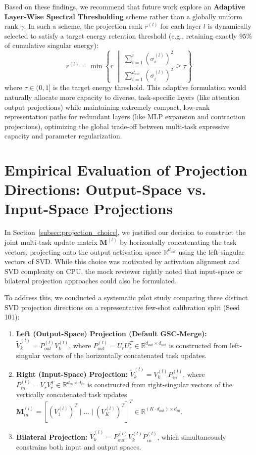 \documentclass{article}
\theoremstyle{plain}
\theoremstyle{definition}
\theoremstyle{remark}
\begin{document}
Based on these findings, we recommend that future work explore an \textbf{Adaptive Layer-Wise Spectral Thresholding} scheme rather than a globally uniform rank $\gamma$. In such a scheme, the projection rank $r^{(l)}$ for each layer $l$ is dynamically selected to satisfy a target energy retention threshold (e.g., retaining exactly $95\%$ of cumulative singular energy):
\begin{equation}
    r^{(l)} = \min \left\{ r \;\middle|\; \frac{\sum_{i=1}^r (\sigma_i^{(l)})^2}{\sum_{i=1}^{d_{out}} (\sigma_i^{(l)})^2} \ge \tau \right\}
\end{equation}
where $\tau \in (0, 1]$ is the target energy threshold. This adaptive formulation would naturally allocate more capacity to diverse, task-specific layers (like attention output projections) while maintaining extremely compact, low-rank representation paths for redundant layers (like MLP expansion and contraction projections), optimizing the global trade-off between multi-task expressive capacity and parameter regularization.

\section{Empirical Evaluation of Projection Directions: Output-Space vs. Input-Space Projections}
\label{appendix:projection_direction_study}

In Section~\ref{subsec:projection_choice}, we justified our decision to construct the joint multi-task update matrix $\mathbf{M}^{(l)}$ by horizontally concatenating the task vectors, projecting onto the output activation space $\mathbb{R}^{d_{out}}$ using the left-singular vectors of SVD. While this choice was motivated by activation alignment and SVD complexity on CPU, the mock reviewer rightly noted that input-space or bilateral projection approaches could also be formulated.

To address this, we conducted a systematic pilot study comparing three distinct SVD projection directions on a representative few-shot calibration split (Seed 101):
\begin{enumerate}
    \item \textbf{Left (Output-Space) Projection (Default GSC-Merge):} $\tilde{V}_k^{(l)} = P_{out}^{(l)} V_k^{(l)}$, where $P_{out}^{(l)} = U_r U_r^T \in \mathbb{R}^{d_{out} \times d_{out}}$ is constructed from left-singular vectors of the horizontally concatenated task updates.
    \item \textbf{Right (Input-Space) Projection:} $\tilde{V}_k^{(l)} = V_k^{(l)} P_{in}^{(l)}$, where $P_{in}^{(l)} = V_r V_r^T \in \mathbb{R}^{d_{in} \times d_{in}}$ is constructed from right-singular vectors of the vertically concatenated task updates $\mathbf{M}_{in}^{(l)} = [ (V_1^{(l)})^T \mid \dots \mid (V_K^{(l)})^T ]^T \in \mathbb{R}^{(K \cdot d_{out}) \times d_{in}}$.
    \item \textbf{Bilateral Projection:} $\tilde{V}_k^{(l)} = P_{out}^{(l)} V_k^{(l)} P_{in}^{(l)}$, which simultaneously constrains both input and output spaces.
\end{enumerate}
\end{document}
